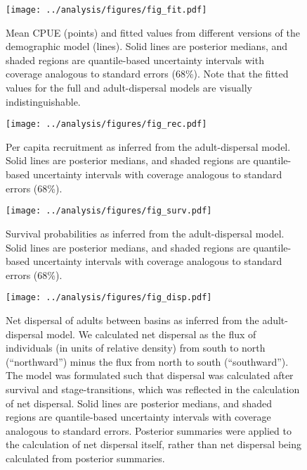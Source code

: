 \documentclass[11pt]{article}
\begin{document}
\clearpage
\begin{figure}
\centering
\texttt{[image: ../analysis/figures/fig\_fit.pdf]}
\caption{\label{fig:fit}
Mean CPUE (points) and fitted values from different versions 
of the demographic model (lines).
Solid lines are posterior medians,
and shaded regions are quantile-based uncertainty intervals
with coverage analogous to standard errors (68\%).
Note that the fitted values for the full and adult-dispersal models 
are visually indistinguishable.
}
\end{figure}
\clearpage

\clearpage
\begin{figure}
\centering
\texttt{[image: ../analysis/figures/fig\_rec.pdf]}
\caption{\label{fig:rec}
Per capita recruitment as inferred from the adult-dispersal model.
Solid lines are posterior medians,
and shaded regions are quantile-based uncertainty intervals
with coverage analogous to standard errors (68\%).
}
\end{figure}
\clearpage

\clearpage
\begin{figure}
\centering
\texttt{[image: ../analysis/figures/fig\_surv.pdf]}
\caption{\label{fig:surv}
Survival probabilities as inferred from the adult-dispersal model.
Solid lines are posterior medians,
and shaded regions are quantile-based uncertainty intervals
with coverage analogous to standard errors (68\%).
}
\end{figure}
\clearpage

\clearpage
\begin{figure}
\centering
\texttt{[image: ../analysis/figures/fig\_disp.pdf]}
\caption{\label{fig:disp}
Net dispersal of adults between basins as inferred from the adult-dispersal model.
We calculated net dispersal as the flux of individuals (in units of relative density)
from south to north (``northward'') minus the flux from north to south (``southward'').
The model was formulated such that dispersal was calculated after survival and stage-transitions,
which was reflected in the calculation of net dispersal.
Solid lines are posterior medians,
and shaded regions are quantile-based uncertainty intervals
with coverage analogous to standard errors.
Posterior summaries were applied to the calculation of net dispersal itself,
rather than net dispersal being calculated from posterior summaries.
}
\end{figure}
\clearpage
\end{document}
